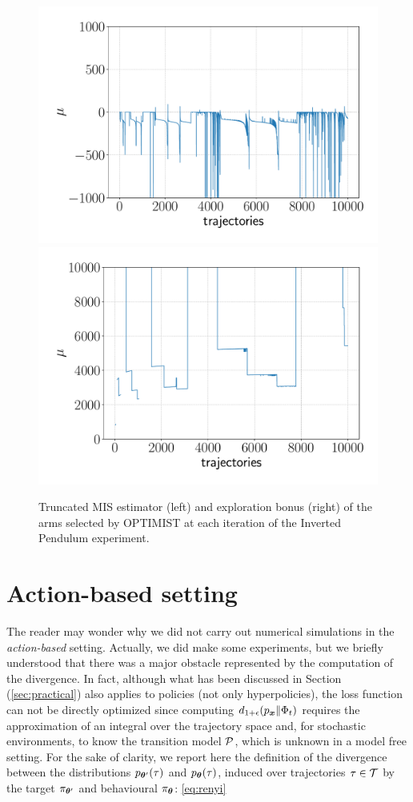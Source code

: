 \begin{figure}[t!] 
\centering
\includegraphics[width=.5\textwidth]{Images/IPmise.pdf}\hfill
\includegraphics[width=.5\textwidth]{Images/IPbonus.pdf}
\caption{Truncated \gls{MIS} estimator (left) and exploration bonus (right) of the arms selected by \gls{OPTIMIST} at each iteration of the Inverted Pendulum experiment.} 
\label{fig:IPbound}
\end{figure} 


\section{Action-based setting}

The reader may wonder why we did not carry out numerical simulations in the \emph{action-based} setting. Actually, we did make some experiments, but we briefly understood that there was a major obstacle represented by the computation of the \Renyi divergence. In fact, although what has been discussed in Section (\ref{sec:practical}) also applies to policies (not only hyperpolicies), the loss function can not be directly optimized since computing $d_{1+\epsilon}(p_{\boldsymbol{x}}\|\Phi_t)$ requires the approximation of an integral over the trajectory space and, for stochastic environments, to know the transition model $\mathcal{P}$, which is unknown in a model free setting. For the sake of clarity, we report here the definition of the \Renyi divergence between the distributions $p_{\boldsymbol{\theta}'}(\tau)$ and $p_{\boldsymbol{\theta}}(\tau)$, induced over trajectories $\tau\in\mathcal{T}$ by the target $\pi_{\boldsymbol{\theta}'}$ and behavioural $\pi_{\boldsymbol{\theta}}$: \ref{eq:renyi}

